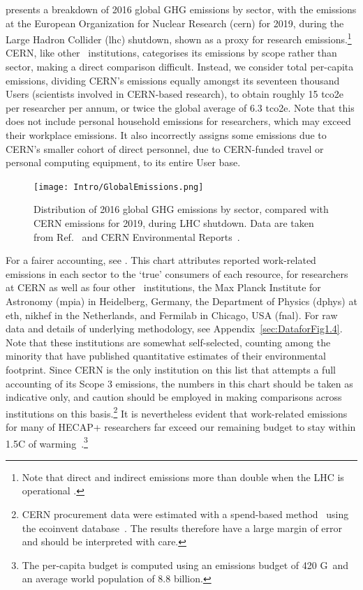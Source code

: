 \documentclass[../SustainableHEP.tex]{subfiles}
\begin{document}
 presents a breakdown of 2016 global GHG emissions by sector, with the emissions at the European Organization for Nuclear Research (\acrshort{cern}) for 2019, during the Large Hadron Collider (\acrshort{lhc}) shutdown, shown as a proxy for research emissions.\footnote{Note that direct and indirect emissions more than double when the LHC is operational \cite{Environment:2737239}.}  CERN, like other \ACR\ institutions, categorises its emissions by scope rather than sector, making a direct comparison difficult.  Instead, we consider total
per-capita emissions, dividing CERN's emissions equally amongst its seventeen thousand Users (scientists involved in CERN-based research), to obtain roughly 15 \acrshort{tco2e} per researcher per annum, or twice the global average of 6.3 \acrshort{tco2e}.  Note that this does not include personal household emissions for researchers, which may exceed their workplace emissions.  It also incorrectly assigns some emissions due to CERN's smaller cohort of direct personnel, \eg due to CERN-funded travel or personal computing equipment, to its entire User base.  
%
\begin{figure}[!tb]
    \centering
    \texttt{[image: Intro/GlobalEmissions.png]}
    \caption[2016 global GHG emissions vs 2019 CERN emissions]%
        {Distribution of 2016 global GHG emissions by sector, compared with CERN emissions for 2019, during LHC shutdown. Data are taken from Ref.~\cite{OWIDGHGSector} and CERN Environmental Reports~\cite{Environment:2737239,CERN:2723123,Hartley}. \label{fig:intro-GlobalEmissions}}
    \end{figure}
%
For a fairer accounting, see .  This chart attributes reported work-related emissions in each sector to the `true' consumers of each resource, for researchers at CERN as well as four other \ACR\ institutions, the Max Planck Institute for Astronomy (\acrshort{mpia}) in Heidelberg, Germany, the Department of Physics (\acrshort{dphys}) at \acrshort{eth}, \acrshort{nikhef} in the Netherlands, and Fermilab in Chicago, USA (\acrshort{fnal}).  For raw data and details of underlying methodology, see Appendix~\ref{sec:DataforFig1.4}.  Note that these institutions are somewhat self-selected, counting among the minority that have published quantitative estimates of their environmental footprint.  Since CERN is the only institution on this list that attempts a full accounting of its Scope 3 emissions, the numbers in this chart should be taken as indicative only, and caution should be employed in making comparisons across institutions on this basis.\footnote{CERN procurement data were estimated with a spend-based method~\cite{SpendBased} using the ecoinvent database~\cite{ecoinvent}. The results therefore have a large margin of error and should be interpreted with care.}   It is nevertheless evident that work-related emissions for many of HECAP+ researchers far exceed our remaining budget to stay within 
1.5\degree C of warming~\cite{IPCC2021reportSPM}.\footnote{The per-capita budget is computed using an emissions budget of 420 G\tCdOe\, and an average world population of 8.8 billion.} 
\end{document}
